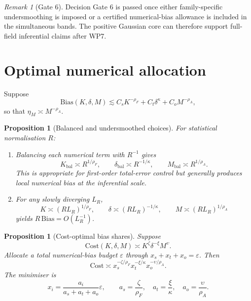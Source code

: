 \documentclass[11pt]{article}
\newtheorem{proposition}[assumption]{Proposition}
\theoremstyle{remark}
\newtheorem{remark}[assumption]{Remark}
\begin{document}
\begin{remark}[Gate 6]
Decision Gate 6 is passed once either family-specific undersmoothing is imposed or a certified numerical-bias allowance is included in the simultaneous bands. The positive Gaussian core can therefore support full-field inferential claims after WP7.
\end{remark}

\section{Optimal numerical allocation}

Suppose
\begin{equation}\label{eq:error-model}
 \mathrm{Bias}(K,\delta,M)
 \lesssim
 C_sK^{-\rho_F}+C_t\delta^\kappa+C_oM^{-\rho_A},
\end{equation}
so that $\eta_M\asymp M^{-\rho_A}$.

\begin{proposition}[Balanced and undersmoothed choices]\label{prop:allocation}
For statistical normalisation $R$:
\begin{enumerate}[label=(\roman*)]
 \item Balancing each numerical term with $R^{-1}$ gives
 \begin{equation}\label{eq:balanced}
 K_{\mathrm{bal}}\asymp R^{1/\rho_F},
 \qquad
 \delta_{\mathrm{bal}}\asymp R^{-1/\kappa},
 \qquad
 M_{\mathrm{bal}}\asymp R^{1/\rho_A}.
 \end{equation}
 This is appropriate for first-order total-error control but generally produces local numerical bias at the inferential scale.
 \item For any slowly diverging $L_R$,
 \begin{equation}\label{eq:strict-under}
 K\asymp(RL_R)^{1/\rho_F},
 \qquad
 \delta\asymp(RL_R)^{-1/\kappa},
 \qquad
 M\asymp(RL_R)^{1/\rho_A}
 \end{equation}
 yields $R\,\mathrm{Bias}=O(L_R^{-1})$.
\end{enumerate}
\end{proposition}

\begin{proposition}[Cost-optimal bias shares]\label{prop:cost}
Suppose
\begin{equation}\label{eq:cost}
 \mathrm{Cost}(K,\delta,M)\asymp K^\zeta\delta^{-\xi}M^\upsilon.
\end{equation}
Allocate a total numerical-bias budget $\varepsilon$ through $x_s+x_t+x_o=\varepsilon$. Then
\[
 \mathrm{Cost}
 \asymp
 x_s^{-\zeta/\rho_F}
 x_t^{-\xi/\kappa}
 x_o^{-\upsilon/\rho_A}.
\]
The minimiser is
\begin{equation}\label{eq:shares}
 x_i=\frac{a_i}{a_s+a_t+a_o}\varepsilon,
 \qquad
 a_s=\frac\zeta{\rho_F},
 \quad
 a_t=\frac\xi\kappa,
 \quad
 a_o=\frac\upsilon{\rho_A}.
\end{equation}
\end{proposition}
\end{document}
